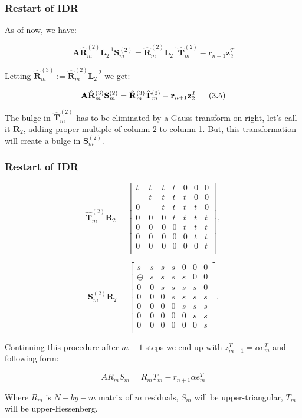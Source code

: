 \documentclass[mathserif]{beamer}
\begin{document}
\begin{frame}
\frametitle{Restart of IDR}
As of now, we have:

\[\mathbf{A} \mathbf{\hat R}_m^{(2)} \mathbf{L}_2^{-1}\mathbf{S}_m^{(2)}=\mathbf{\hat R}_m^{(2)}\mathbf{L}_2^{-1}\mathbf{\hat T}_m^{(2)}-\mathbf{r}_{n+1}\mathbf{z}_2^T\]

Letting $\mathbf{\hat R}_m^{(3)}:= \mathbf{\hat R}_m^{(2)}\mathbf{L}_2^{-2}$ we get:

\[\mathbf{A} \mathbf{\hat R}_m^{(3)}\mathbf{S}_m^{(2)}=\mathbf{\hat R}_m^{(3)} \mathbf{\hat T}_m^{(2)}-\mathbf{r}_{n+1}\mathbf{z}_2^T \hspace{.2in} (3.5)\]

\pause The bulge in $\mathbf{\hat T}_m^{(2)}$ has to be eliminated by a Gauss transform on right, let's call it $\mathbf{R}_2$, adding proper multiple of column 2 to column 1. But, this transformation will create a bulge in $\mathbf{S}_m^{(2)}$.
\end{frame}

\begin{frame}
\frametitle{Restart of IDR}
\[
\mathbf{\hat T}_m^{(2)} \mathbf{R}_2= \left[
\begin{array}{cccccccc}
t & t & t & t  & 0 & 0 & 0 \\
+ & t & t & t  & t & 0 & 0 \\
0 & +  & t  & t  & t & t & 0 \\
0 & 0  & 0  & t  & t & t & t \\
0 & 0  & 0  & 0  & t & t & t \\
0 & 0  & 0  & 0  & 0 & t & t\\
0 & 0  & 0  & 0  & 0 & 0 & t \\
\end{array}
\right], \]


\[\mathbf{S}_m^{(2)}\mathbf{R}_2=\left[
\begin{array}{cccccccc}
s & s & s & s  & 0 & 0 & 0 \\
\oplus & s & s & s  & s & 0 & 0 \\
0 & 0 & s & s & s & s & 0 \\
0 & 0  & 0  & s & s & s & s \\
0 & 0  & 0  & 0  & s & s & s \\
0 & 0  & 0  & 0  & 0 & s & s\\
0 & 0  & 0  & 0  & 0 & 0 & s \\
\end{array}
\right].
\]
\end{frame}

\begin{frame}
Continuing this procedure after $m-1$ steps we end up with $z_{m-1}^T= \alpha e_m^T$ and following form:

\[A R_m S_m = R_m T_m -r_{n+1} \alpha e_m^T\]

Where $R_m$ is $N-by-m$ matrix of $m$ residuals, $S_m$ will be upper-triangular, $T_m$ will be upper-Hessenberg.
\end{frame}
\end{document}

